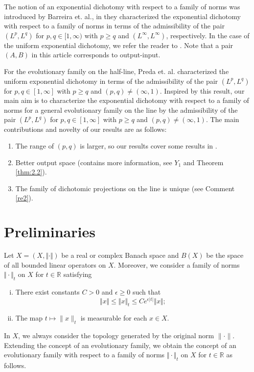 \documentclass[reqno]{amsart}
\def\r{\mathbb{R}}
\begin{document}
The notion of an exponential dichotomy with respect to a family of norms was introduced by Barreira et. al., in \cite{14,17} they characterized the exponential dichotomy with respect to a family of norms in terms of the admissibility of the pair $(L^p,L^q)$ for $p,q \in [1,\infty)$ with $p\ge q$ and $(L^\infty,L^\infty)$, respectively. In the case of the uniform exponential dichotomy, we refer the reader to \cite{16,12,13,15}. Note that a pair $(A, B)$ in this article corresponds to output-input.

For the evolutionary family on the half-line, Preda et. al. \cite{16} characterized the uniform exponential dichotomy in terms of the admissibility of the pair $(L^p,L^q)$ for $p,q \in [1,\infty]$ with $p\ge q$ and $(p,q) \ne (\infty, 1)$. Inspired by this result, our main aim is to characterize the exponential dichotomy with respect to a family of norms for a general evolutionary family on the line by the admissibility of the pair $(L^p,L^q)$ for $p,q \in [1,\infty]$ with $p\ge q$ and $(p,q) \ne (\infty, 1)$. The main contributions and novelty of our results are as follows:
\begin{enumerate}
\item The range of $(p,q)$ is larger, so our results cover some results in \cite{17,14}.
\item Better output space (contains more information, see $Y_1$ and Theorem \ref{thm:2.2}).
\item The family of dichotomic projections on the line is unique (see Comment \ref{re2}).
\end{enumerate}

\section{Preliminaries}
Let $X=(X,\Vert\cdot\Vert)$ be a real or complex Banach space and $B(X)$ be the space of all bounded linear operators on $X$. Moreover, we consider a family of norms $\Vert \cdot\Vert _t$ on $X$ for $t\in \r$ satisfying
\begin{enumerate}[(i)]
\item There exist constants $C>0$ and $\epsilon \geq 0$ such that 
\begin{equation}
\Vert x \Vert \leq \Vert x\Vert_t \leq Ce^{\epsilon|t|}\Vert x \Vert;    \label{2.3}
\end{equation}
\item The map $ t \mapsto \|x\|_t$ is measurable for each $x \in X$.   
\end{enumerate}
In $X$, we always consider the topology generated by the original norm $\|\cdot\|$. Extending the concept of an evolutionary family, we obtain the concept of an evolutionary family with respect to a family of norms $\Vert \cdot\Vert _t$ on $X$ for $t\in \r$ as follows.
\end{document}
